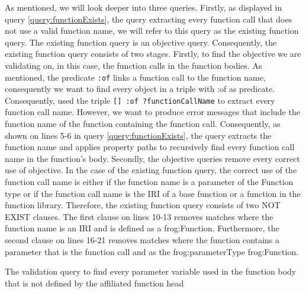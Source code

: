 \para 
As mentioned, we will look deeper into three queries. Firstly, as displayed in query \ref{query:functionExists}, the query extracting every function call that does not use a valid function name, we will refer to this query as the existing function query. The existing function query is an objective query. Consequently, the existing function query consists of two stages. Firstly, to find the objective we are validating on, in this case, the function calls in the function bodies. As mentioned, the predicate \lstinline{:of} links a function call to the function name, consequently we want to find every object in a triple with :of as predicate. Consequently, used the triple \lstinline{[] :of ?functionCallName} to extract every function call name. However, we want to produce error messages that include the function name of the function containing the function call. Consequently, as shown on lines 5-6 in query \ref{query:functionExists}, the query extracts the function name and applies property paths to recursively find every function call name in the function's body. Secondly, the objective queries remove every correct use of objective. In the case of the existing function query, the correct use of the function call name is either if the function name is a parameter of the Function type or if the function call name is the IRI of a base function or a function in the function library. Therefore, the existing function query consists of two NOT EXIST clauses. The first clause on lines 10-13 removes matches where the function name is an IRI and is defined as a frog:Function. Furthermore, the second clause on lines 16-21 removes matches where the function contains a parameter that is the function call and as the frog:parameterType frog:Function. 

\begin{query}
    The validation query to find every parameter variable used in the function body that is not defined by the affiliated function head 
    \label{query:undefinedParameter}
\end{query}


